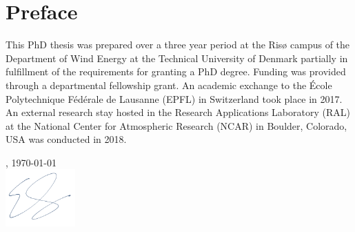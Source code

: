 \chapter{Preface}
\label{sec:preface}


This PhD thesis was prepared over a three year period at the Ris{\o} campus of the Department of Wind Energy at the Technical University of Denmark partially in fulfillment of the requirements for granting a PhD degree. Funding was provided through a departmental fellowship grant. An academic exchange to the {\'E}cole Polytechnique F{\'e}d{\'e}rale de Lausanne (EPFL) in Switzerland took place in 2017. An external research stay hosted in the Research Applications Laboratory (RAL) at the National Center for Atmospheric Research (NCAR) in Boulder, Colorado, USA was conducted in 2018.

\vfill

{
\flushright
    \thesislocation{}, \today\\[1cm]
    \hspace{3cm}\includegraphics[width=0.2\textwidth]{graphics/signature.png}\\[1cm]
\begin{flushright}
    \thesisauthor{}
\end{flushright}
}
